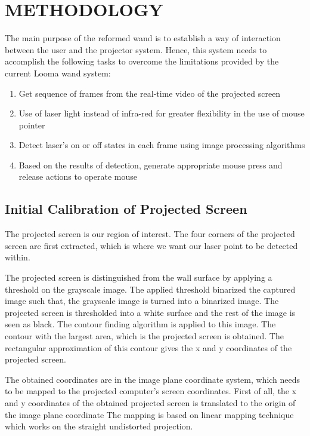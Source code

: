 \documentclass[12pt, a4paper]{article}
\begin{document}
\section{METHODOLOGY}
The main purpose of the reformed wand is to establish a way of interaction between the user and the projector system. Hence, this system needs to accomplish the following tasks to overcome the limitations provided by the current Looma wand system:
\begin{enumerate}
\item Get sequence of frames from the real-time video of the projected screen
\item Use of laser light instead of infra-red for greater flexibility in the use of mouse pointer
\item Detect laser’s on or off states in each frame using image processing algorithms
\item Based on the results of detection, generate appropriate mouse press and release actions to operate mouse
\end{enumerate}

\subsection{Initial Calibration of Projected Screen}
	 The projected screen is our region of interest. The four corners of the projected screen are first extracted, which is where we want our laser point to be detected within. 
	 
    The projected screen is distinguished from the wall surface by applying a threshold on the grayscale image. The applied threshold binarized the captured image such that, the grayscale image is turned into a binarized image. The projected screen is thresholded into a white surface and the rest of the image is seen as black. The contour finding algorithm is applied to this image. The contour with the largest area, which is the projected screen is obtained. The rectangular approximation of this contour gives the x and y coordinates of the projected screen. 
 
    The obtained coordinates are in the image plane coordinate system, which needs to be mapped to the projected computer’s screen coordinates. First of all, the x and y coordinates of the obtained projected screen is translated to the origin of the image plane coordinate 
The mapping is based on linear mapping technique which works on the straight undistorted projection. 
\end{document}
